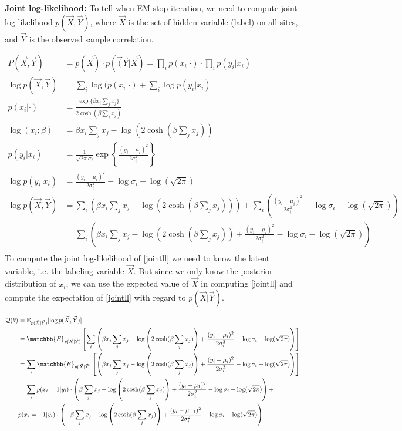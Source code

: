\documentclass[12pt]{article}
\begin{document}
\textbf{Joint log-likelihood: } To tell when EM stop iteration, we need to compute joint log-likelihood $p(\vec X, \vec Y)$, where $\vec X$ is the set of hidden variable (label) on all sites, and $\vec Y$ is the observed sample correlation.

\begin{align}
  P(\vec X, \vec Y) &= p(\vec X) \cdot p(\vec (\vec Y | \vec X) = \prod_i p(x_i | \cdot) \cdot \prod_i p(y_i | x_i)\\
  \log p(\vec X, \vec Y) &= \sum_i \log(p(x_i | \cdot ) + \sum_i \log p(y_i | x_i)\\
  p(x_i | \cdot ) &= \frac{ \exp\{ \beta x_i \sum_j x_j\}}{2\cosh (\beta \sum_j x_j)}\\
  \log(x_i; \beta) &= \beta x_i \sum_j x_j - \log \left(2\cosh(\beta \sum_j x_j)\right)\\
  p(y_i | x_i) &= \frac{1}{\sqrt{2\pi} \sigma_i}\exp \left \{ \frac{(y_i - \mu_i)^2}{2\sigma_i^2}\right \}\\
  \log p(y_i | x_i) &= \frac{(y_i - \mu_i)^2}{2\sigma_i^2} - \log \sigma_i - \log (\sqrt{2\pi})\\
  \log p(\vec X, \vec Y) &= \sum_i \left (\beta x_i \sum_j x_j - \log \left(2\cosh(\beta \sum_j x_j)\right) \right ) + \sum_i \left (\frac{(y_i - \mu_i)^2}{2\sigma_i^2} - \log \sigma_i - \log (\sqrt{2\pi}) \right ) \\
  &= \sum_i \left (\beta x_i \sum_j x_j - \log \left(2\cosh(\beta \sum_j x_j)\right) + \frac{(y_i - \mu_i)^2}{2\sigma_i^2} - \log \sigma_i - \log (\sqrt{2\pi}) \right ) \label{jointll}\\
\end{align}
To compute the joint log-likelihood of \eqref{jointll} we need to know the latent variable, i.e. the labeling variable $\vec X$. But since we only know the posterior distribution of $x_i$, we can use the expected value of $\vec X$ in computing \eqref{jointll} and compute the expectation of \eqref{jointll} with regard to $p(\vec X | \vec Y)$. 

\begin{align*}
  \mathcal{Q}(\theta) &= \mathbb{E}_{p(\vec X|\vec Y)} [\log p(\vec X, \vec Y)]\\
  &= \matchbb{E}_{p(\vec X|\vec Y)} \left [  \sum_i \left (\beta x_i \sum_j x_j - \log \left(2\cosh(\beta \sum_j x_j)\right) + \frac{(y_i - \mu_i)^2}{2\sigma_i^2} - \log \sigma_i - \log (\sqrt{2\pi}) \right )  \right] \\
  &=  \sum_i \matchbb{E}_{p(\vec X|\vec Y)} \left [ \left (\beta x_i \sum_j x_j - \log \left(2\cosh(\beta \sum_j x_j)\right) + \frac{(y_i - \mu_i)^2}{2\sigma_i^2} - \log \sigma_i - \log (\sqrt{2\pi}) \right )  \right] \\
  &= \sum_i p(x_i = 1 | y_i) \cdot \left (\beta \sum_j x_j - \log \left(2\cosh(\beta \sum_j x_j)\right) + \frac{(y_i - \mu_1)^2}{2\sigma_i^2} - \log \sigma_i - \log (\sqrt{2\pi}) \right ) +\\
& p(x_i = -1 | y_i) \cdot \left (-\beta \sum_j x_j - \log \left(2\cosh(\beta \sum_j x_j)\right) + \frac{(y_i - \mu_{-1})^2}{2\sigma_i^2} - \log \sigma_i - \log (\sqrt{2\pi}) \right )
\end{align*}
\end{document}
